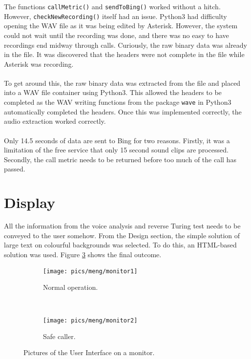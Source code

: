 \documentclass[main.tex]{subfiles}
\begin{document}
The functions \texttt{callMetric()} and \texttt{sendToBing()} worked without a hitch. However, \texttt{checkNewRecording()} itself had an issue. Python3 had difficulty opening the WAV file as it was being edited by Asterisk. However, the system could not wait until the recording was done, and there was no easy to have recordings end midway through calls. Curiously, the raw binary data was already in the file. It was discovered that the headers were not complete in the file while Asterisk was recording.
\\\\
To get around this, the raw binary data was extracted from the file and placed into a WAV file container using Python3. This allowed the headers to be completed as the WAV writing functions from the package \texttt{wave} in Python3 automatically completed the headers. Once this was implemented correctly, the audio extraction worked correctly.
\\\\
Only 14.5 seconds of data are sent to Bing for two reasons. Firstly, it was a limitation of the free service that only 15 second sound clips are processed. Secondly, the call metric needs to be returned before too much of the call has passed.

\section{Display}
All the information from the voice analysis and reverse Turing test needs to be conveyed to the user somehow. From the Design section, the simple solution of large text on colourful backgrounds was selected. To do this, an HTML-based solution was used. Figure \ref{fig:displays} shows the final outcome.

\begin{figure}[htb]
	\captionsetup[subfigure]{position=b}
        \centering
        \begin{subfigure}{0.47\textwidth}
                \texttt{[image: pics/meng/monitor1]}
                \caption{Normal operation.}
                \label{fig:display1}
        \end{subfigure}
        ~
		\begin{subfigure}{0.47\textwidth}
                \texttt{[image: pics/meng/monitor2]}
                \caption{Safe caller.}
                \label{fig:display2}
        \end{subfigure}
	\caption{Pictures of the User Interface on a monitor.}
	\label{fig:displays}
\end{figure}
\end{document}
